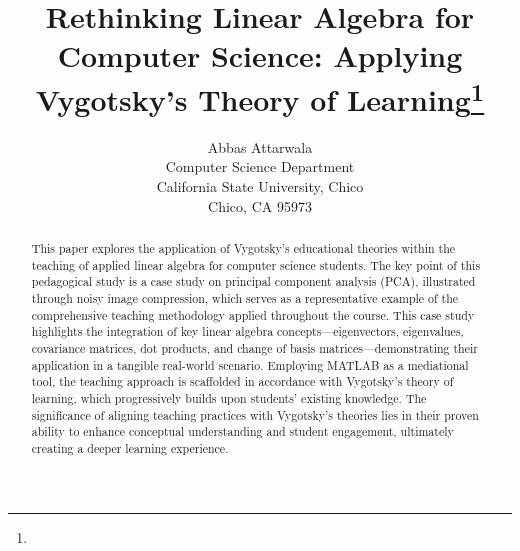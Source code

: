 \documentclass{article}
\title{Rethinking Linear Algebra for Computer Science: Applying Vygotsky’s Theory of Learning\footnote{\protect}
}
\author{
    Abbas Attarwala\\
    Computer Science Department\\
    California State University, Chico\\
    Chico, CA 95973\\
    \email{aattarwala@csuchico.edu}
  }
\begin{document}
\maketitle
\thispagestyle{empty}
\pagestyle{empty}

\begin{abstract}
 This paper explores the application of Vygotsky's educational theories within the teaching of applied linear algebra for computer science students. 
 The key point of this pedagogical study is a case study on principal component analysis (PCA), illustrated through noisy image compression, which serves as a representative example of the comprehensive teaching methodology applied throughout the course. 
 This case study highlights the integration of key linear algebra concepts—eigenvectors, eigenvalues, covariance matrices, dot products, and change of basis matrices—demonstrating their application in a tangible real-world scenario. 
 Employing MATLAB as a mediational tool, the teaching approach is scaffolded in accordance with Vygotsky's theory of learning, which progressively builds upon students' existing knowledge. 
 The significance of aligning teaching practices with Vygotsky's theories lies in their proven ability to enhance conceptual understanding and student engagement, ultimately creating a deeper learning experience. 

\end{abstract}
\end{document}
